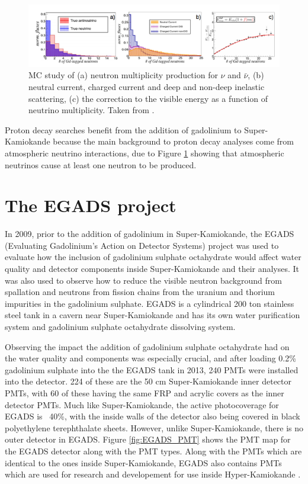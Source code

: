 \begin{figure}[H]
    \includegraphics[width=\textwidth]{Figures/atm_recon_energy.png}
\caption{MC study of (a) neutron multiplicity production for $\nu$ and ${\bar{\nu}}$, (b) neutral current, charged current and deep and non-deep inelastic scattering, (c) the correction to the visible energy as a function of neutrino multiplicity. Taken from \cite{marti_evaluation_2020}.}
\label{fig:atm_nu_energy}
\end{figure}


Proton decay searches benefit from the addition of gadolinium to Super-Kamiokande because the main background to proton decay analyses come from atmospheric neutrino interactions, due to Figure \ref{fig:atm_nu_energy} showing that atmospheric neutrinos cause at least one neutron to be produced. 

\section{The EGADS project}

In 2009, prior to the addition of gadolinium in Super-Kamiokande, the EGADS (Evaluating Gadolinium's Action on Detector Systems) project was used to evaluate how the inclusion of gadolinium sulphate octahydrate would affect water quality and detector components inside Super-Kamiokande and their analyses. It was also used to observe how to reduce the visible neutron background from spallation and neutrons from fission chains from the uranium and thorium impurities in the gadolinium sulphate. EGADS is a cylindrical 200 ton stainless steel tank in a cavern near Super-Kamiokande and has its own water purification system and gadolinium sulphate octahydrate dissolving system. 

Observing the impact the addition of gadolinium sulphate octahydrate had on the water quality and components was especially crucial, and after loading 0.2\% gadolinium sulphate into the the EGADS tank in 2013, 240 PMTs were installed into the detector. 224 of these are the 50 cm Super-Kamiokande inner detector PMTs, with 60 of these having the same FRP and acrylic covers as the inner detector PMTs. Much like Super-Kamiokande, the active photocoverage for EGADS is ~40\%, with the inside walls of the detector also being covered in black polyethylene terephthalate sheets. However, unlike Super-Kamiokande, there is no outer detector in EGADS. Figure \ref{fig:EGADS_PMT} shows the PMT map for the EGADS detector along with the PMT types. Along with the PMTs which are identical to the ones inside Super-Kamiokande, EGADS also contains PMTs which are used for research and developement for use inside Hyper-Kamiokande \cite{marti_evaluation_2020}.

